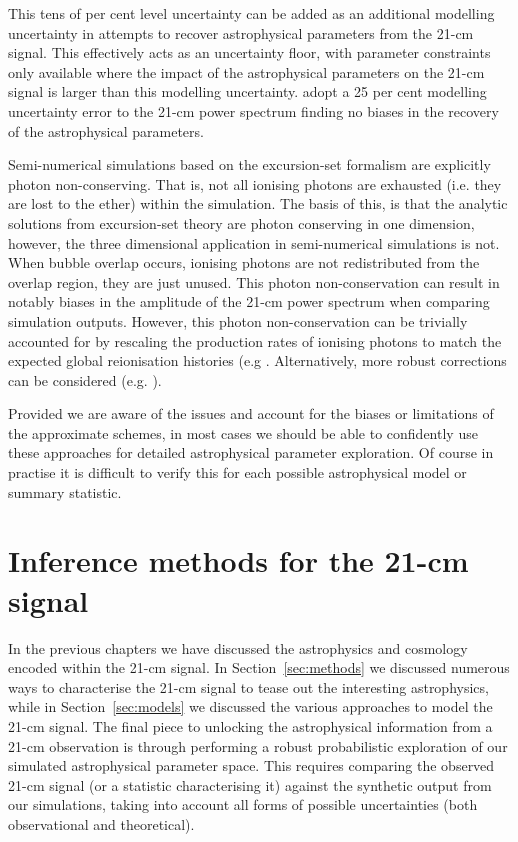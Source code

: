 This tens of per cent level uncertainty can be added as an additional modelling uncertainty in attempts to recover astrophysical parameters from the 21-cm signal. This effectively acts as an uncertainty floor, with parameter constraints only available where the impact of the astrophysical parameters on the 21-cm signal is larger than this modelling uncertainty. \cite{Greig:2015,Greig:2019} adopt a 25 per cent modelling uncertainty error to the 21-cm power spectrum finding no biases in the recovery of the astrophysical parameters.

Semi-numerical simulations based on the excursion-set formalism are explicitly photon non-conserving. That is, not all ionising photons are exhausted (i.e. they are lost to the ether) within the simulation. The basis of this, is that the analytic solutions from excursion-set theory are photon conserving in one dimension, however, the three dimensional application in semi-numerical simulations is not. When bubble overlap occurs, ionising photons are not redistributed from the overlap region, they are just unused. This photon non-conservation can result in notably biases in the amplitude of the 21-cm power spectrum \cite{Choudhury:2018} when comparing simulation outputs. However, this photon non-conservation can be trivially accounted for by rescaling the production rates of ionising photons to match the expected global reionisation histories (e.g \cite{Zahn:2011,Majumdar:2014}. Alternatively, more robust corrections can be considered (e.g. \cite{Paranjape:2016,Choudhury:2018,Molaro:2019}).

Provided we are aware of the issues and account for the biases or limitations of the approximate schemes, in most cases we should be able to confidently use these approaches for detailed astrophysical parameter exploration. Of course in practise it is difficult to verify this for each possible astrophysical model or summary statistic.

\section{Inference methods for the 21-cm signal}

In the previous chapters we have discussed the astrophysics and cosmology encoded within the 21-cm signal. In Section~\ref{sec:methods} we discussed numerous ways to characterise the 21-cm signal to tease out the interesting astrophysics, while in Section~\ref{sec:models} we discussed the various approaches to model the 21-cm signal. The final piece to unlocking the astrophysical information from a 21-cm observation is through performing a robust probabilistic exploration of our simulated astrophysical parameter space. This requires comparing the observed 21-cm signal (or a statistic characterising it) against the synthetic output from our simulations, taking into account all forms of possible uncertainties (both observational and theoretical). 

